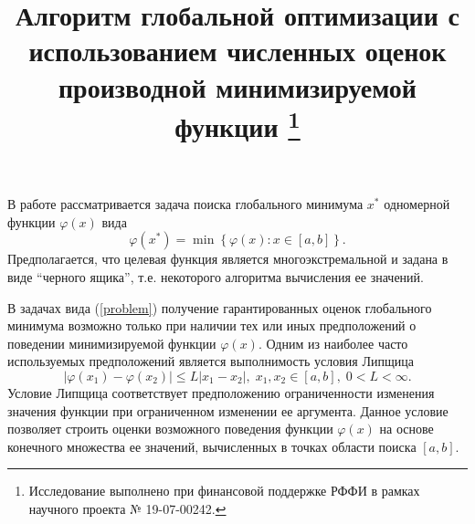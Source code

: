 \documentclass[11pt, oneside, a4paper]{article}
\begin{document}
\setcounter{page}{1}



\title{
Алгоритм глобальной оптимизации с использованием численных оценок производной минимизируемой функции
\footnote{Исследование выполнено при финансовой поддержке РФФИ в рамках научного проекта № 19-07-00242.}
}





\bigskip

В работе рассматривается задача поиска глобального минимума $x^*$ одномерной функции $\varphi(x)$ вида
\begin{equation}\label{problem}
\varphi(x^*)=\min\left\{\varphi(x):x\in\left[a,b\right]\right\}.
\end{equation}
Предполагается, что целевая функция является многоэкстремальной и задана в виде ``черного ящика'', т.е. некоторого алгоритма вычисления ее значений. 

В задачах вида (\ref{problem}) получение гарантированных оценок глобального минимума возможно только при наличии тех или иных предположений о поведении минимизируемой функции $\varphi(x)$. Одним из наиболее часто используемых предположений является выполнимость условия Липщица
\[
\left|\varphi(x_1)-\varphi(x_2)\right|\leq L\left|x_1-x_2\right|,\; x_1,x_2 \in [a,b],\; 0<L<\infty.
\]
Условие Липщица соответствует предположению ограниченности изменения значения функции при ограниченном изменении ее аргумента. Данное условие позволяет строить оценки возможного поведения функции $\varphi(x)$ на основе конечного множества ее значений, вычисленных в точках области поиска $[a,b]$.
\end{document}
